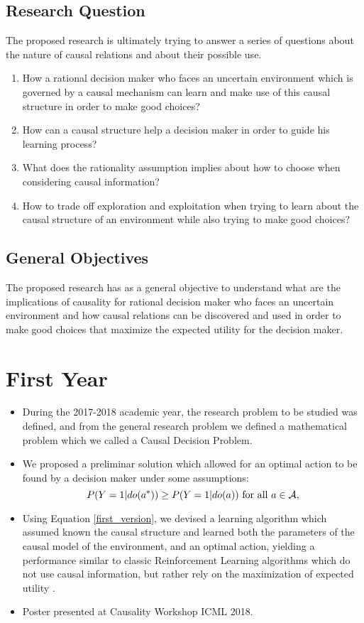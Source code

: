 \documentclass[english,letterpaper,12pt,final]{article}
\theoremstyle{definition}
\begin{document}
\subsection{Research Question}
The proposed research is ultimately trying to answer a series of questions about the nature of causal relations and about their possible use.
\begin{enumerate}
\item How a rational decision maker who faces an uncertain environment which is governed by a causal mechanism can learn and make use of this causal structure in order to make good choices? \item How can a causal structure help a decision maker in order to guide his learning process? 
\item What does the rationality assumption implies about how to choose when considering causal information? 
\item How to trade off exploration and exploitation when trying to learn about the causal structure of an environment while also trying to make good choices?
\end{enumerate}

\subsection{General Objectives}
			The proposed research has as a general objective to understand what are the implications of causality for rational decision maker who faces an uncertain environment and how causal relations can be discovered and used in order to make good choices that maximize the expected utility for the decision maker.
\newpage
\section{First Year}{\label{first_year}}
\begin{itemize}
\item During the 2017-2018 academic year, the research problem to be studied was defined, and from the general research problem we defined a mathematical problem which we called a Causal Decision Problem.
\item We proposed a preliminar solution which allowed for an optimal action to be found by a decision maker under some assumptions:
\begin{equation}{\label{first_version}}
P(Y=1 | do(a^\ast)) \geq P(Y=1 | do(a)) \textrm{ for all } a \in \mathcal{A},
\end{equation}
\item Using Equation \ref{first_version}, we devised a learning algorithm which assumed known the causal structure and learned both the parameters of the causal model of the environment, and an optimal action, yielding a performance similar to classic Reinforcement Learning algorithms which do not use causal information, but rather rely on the maximization of expected utility \citep{gonzalez2018playing}.
\item Poster presented at Causality Workshop ICML 2018.
\end{itemize}
\end{document}
